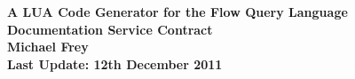 \documentclass[paper=a4,nenglish]{scrartcl}
\begin{document}
\begin{titlepage}   


\setlength{\parindent}{0em}   

\begin{minipage}{170mm} 
  \begin{minipage}{5cm}
    \par\vspace*{4mm}
  \end{minipage}
  \begin{minipage}{6cm}
    \hfill
  \end{minipage}
  \begin{minipage}{5cm} 
    \centering
  \end{minipage}   
\end{minipage}  
\smallskip  \centering
  \begin{minipage}{\textwidth}     \centering     \vspace{5cm}
    \renewcommand{\baselinestretch}{1.8}    \small\normalsize     {\Huge \bf
    A LUA Code Generator for the Flow Query Language \\ \normalsize Documentation Service Contract}\\ \vspace{2cm} {\normalsize \bf Michael Frey}\\  \vspace{6cm} {\small \bf
    Last Update: 12th December 2011 }\\    \renewcommand{\baselinestretch}{1}
    \small\normalsize   \end{minipage}   
\clearpage 
\end{titlepage} 

\newpage
\tableofcontents
\newpage
\listoffigures
\newpage
\listoftables
\newpage
\lstlistoflistings










\end{document}
